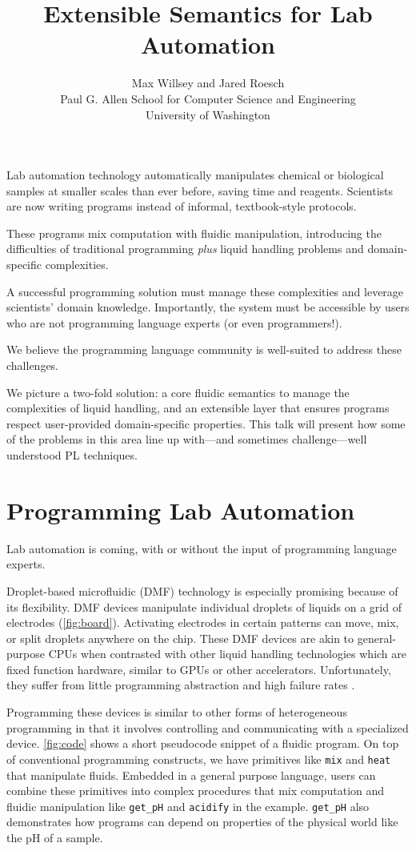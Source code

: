 \documentclass[
  10pt,
  a4paper,
  twocolumn,
]{article}
\title{Extensible Semantics for Lab Automation}
\author{Max Willsey and Jared Roesch
\\ \small Paul G. Allen School for Computer Science and Engineering
\\ \small University of Washington}
\date{}
\begin{document}
\maketitle

Lab automation technology automatically manipulates chemical or biological samples at smaller scales than ever before, saving time and reagents.
Scientists are now writing programs instead of informal, textbook-style protocols.

These programs mix computation with fluidic manipulation, introducing the
difficulties of traditional programming \emph{plus} liquid handling problems and domain-specific complexities.

A successful programming solution must manage these complexities
and leverage scientists' domain knowledge. Importantly, the system must be accessible
by users who are not programming language experts (or even programmers!).

We believe the programming language community is well-suited
to address these challenges.

We picture a two-fold solution:
a core fluidic semantics to manage the complexities of liquid handling,
and an extensible layer that ensures programs respect user-provided domain-specific properties.
This talk will present how some of the problems in this area line up with---and sometimes
challenge---well understood PL techniques.

\section*{Programming Lab Automation}

Lab automation is coming, with or without the input of programming language experts.

Droplet-based microfluidic (DMF) technology is especially promising because of its flexibility.
DMF devices manipulate individual droplets of liquids on a grid of electrodes (\autoref{fig:board}).
Activating electrodes in certain patterns can move, mix, or split droplets anywhere on the chip.
These DMF devices are akin to general-purpose CPUs when contrasted with other liquid handling
technologies which are fixed function hardware,  similar to GPUs or other accelerators.
Unfortunately, they suffer from little programming abstraction and high failure rates \cite{dmf-review}.

Programming these devices is similar to other forms of heterogeneous programming in that
it involves controlling and communicating with a specialized device.
\autoref{fig:code} shows a short pseudocode snippet of a fluidic program.
On top of conventional programming constructs, we have primitives like {\tt mix} and {\tt heat} that manipulate fluids.
Embedded in a general purpose language, users can combine these primitives into complex procedures that mix computation and fluidic manipulation like {\tt get\_pH} and {\tt acidify} in the example.
{\tt get\_pH} also demonstrates how programs can depend on properties of the physical world like the pH of a sample.
\end{document}

